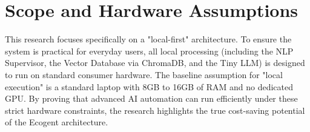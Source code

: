 \section{Scope and Hardware Assumptions}
This research focuses specifically on a "local-first" architecture. To ensure the system is practical for everyday users, all local processing (including the NLP Supervisor, the Vector Database via ChromaDB, and the Tiny LLM) is designed to run on standard consumer hardware. The baseline assumption for "local execution" is a standard laptop with 8GB to 16GB of RAM and no dedicated GPU. By proving that advanced AI automation can run efficiently under these strict hardware constraints, the research highlights the true cost-saving potential of the Ecogent architecture.\\